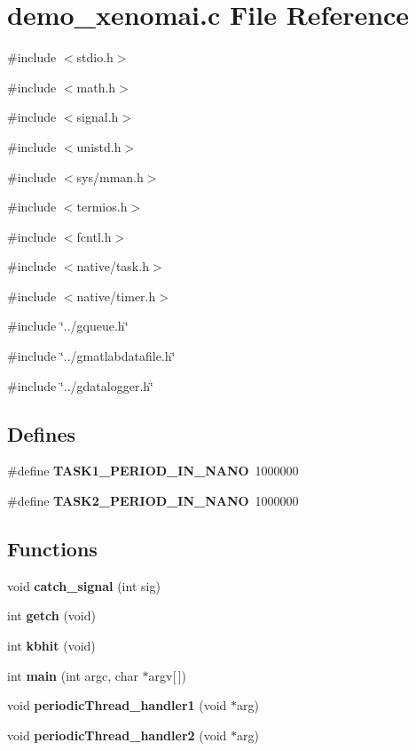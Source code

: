 \section{demo\_\-xenomai.c File Reference}
\label{demo__xenomai_8c}
{\ttfamily \#include $<$stdio.h$>$}\par
{\ttfamily \#include $<$math.h$>$}\par
{\ttfamily \#include $<$signal.h$>$}\par
{\ttfamily \#include $<$unistd.h$>$}\par
{\ttfamily \#include $<$sys/mman.h$>$}\par
{\ttfamily \#include $<$termios.h$>$}\par
{\ttfamily \#include $<$fcntl.h$>$}\par
{\ttfamily \#include $<$native/task.h$>$}\par
{\ttfamily \#include $<$native/timer.h$>$}\par
{\ttfamily \#include \char`\"{}../gqueue.h\char`\"{}}\par
{\ttfamily \#include \char`\"{}../gmatlabdatafile.h\char`\"{}}\par
{\ttfamily \#include \char`\"{}../gdatalogger.h\char`\"{}}\par
\subsection*{Defines}
\begin{DoxyCompactItemize}
\item 
\#define {\bf TASK1\_\-PERIOD\_\-IN\_\-NANO}~1000000
\item 
\#define {\bf TASK2\_\-PERIOD\_\-IN\_\-NANO}~1000000
\end{DoxyCompactItemize}
\subsection*{Functions}
\begin{DoxyCompactItemize}
\item 
void {\bf catch\_\-signal} (int sig)
\item 
int {\bf getch} (void)
\item 
int {\bf kbhit} (void)
\item 
int {\bf main} (int argc, char $\ast$argv[$\,$])
\item 
void {\bf periodicThread\_\-handler1} (void $\ast$arg)
\item 
void {\bf periodicThread\_\-handler2} (void $\ast$arg)
\end{DoxyCompactItemize}
